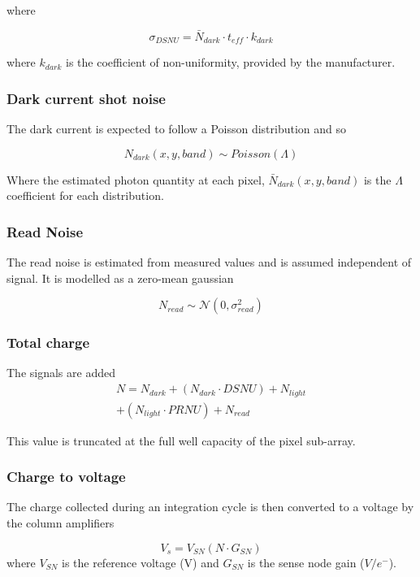 \documentclass[10pt,a4paper,final,twocolumn]{article}
\begin{document}
where

\begin{equation}
\sigma_{DSNU} = \bar{N}_{dark} \cdot t_{eff} \cdot k_{dark}
\end{equation}

where $k_{dark}$ is the coefficient of non-uniformity, provided by the manufacturer.

\subsubsection{Dark current shot noise}
The dark current is expected to follow a Poisson distribution and so 

\begin{equation}
N_{dark}(x, y, band) \sim Poisson(\Lambda)
\end{equation}

Where the estimated photon quantity at each pixel, $\bar{N}_{dark}(x, y, band) $ is the $\Lambda$ coefficient for each distribution.

\subsubsection{Read Noise}
The read noise is estimated from measured values and is assumed independent of signal. It is modelled as a zero-mean gaussian

\begin{equation}
N_{read} \sim \mathcal{N}(0, \sigma_{read}^{2})
\end{equation}

\subsubsection{Total charge}
The signals are added
\begin{multline}
N = N_{dark} + (N_{dark} \cdot DSNU) + N_{light}\\
+ (N_{light} \cdot PRNU) + N_{read}
\end{multline}

This value is truncated at the full well capacity of the pixel sub-array.


\subsubsection{Charge to voltage}
The charge collected during an integration cycle is then converted to a voltage by the column amplifiers

\begin{equation}
V_s = V_{SN}(N \cdot G_{SN})
\end{equation}
where $V_{SN}$  is the reference voltage (V) and $G_{SN}$ is the sense node gain ($V/e^{-}$).
\end{document}

